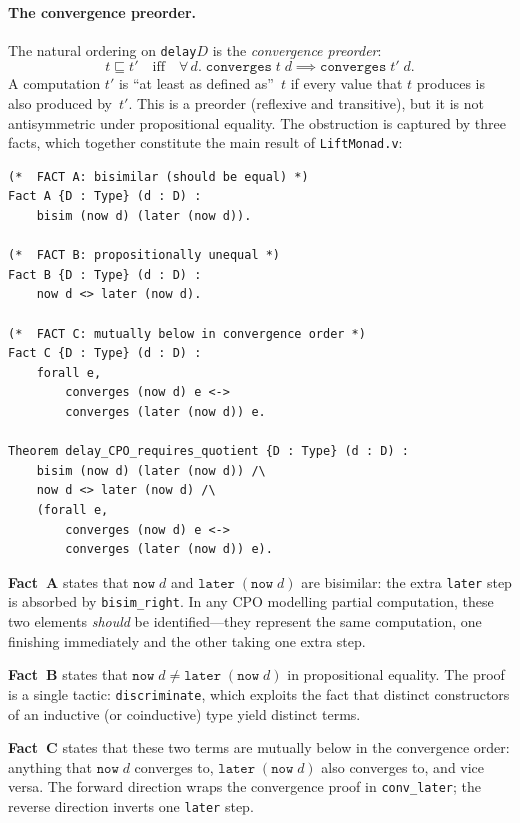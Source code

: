 \paragraph{The convergence preorder.}
The natural ordering on \texttt{delay}\;$D$ is the
\emph{convergence preorder}:
\[
  t \sqsubseteq t'
  \quad\text{iff}\quad
  \forall\, d.\;
  \texttt{converges}\;t\;d \implies \texttt{converges}\;t'\;d.
\]
A computation $t'$ is ``at least as defined as''~$t$ if every value
that $t$ produces is also produced by~$t'$.
This is a preorder (reflexive and transitive), but it is not
antisymmetric under propositional equality.
The obstruction is captured by three facts, which together constitute
the main result of \texttt{LiftMonad.v}:

\begin{lstlisting}[caption={The CPO obstruction theorem
  (\texttt{LiftMonad.v}).},
                    label={lst:obstruction}]
(*  FACT A: bisimilar (should be equal) *)
Fact A {D : Type} (d : D) :
    bisim (now d) (later (now d)).

(*  FACT B: propositionally unequal *)
Fact B {D : Type} (d : D) :
    now d <> later (now d).

(*  FACT C: mutually below in convergence order *)
Fact C {D : Type} (d : D) :
    forall e,
        converges (now d) e <->
        converges (later (now d)) e.

Theorem delay_CPO_requires_quotient {D : Type} (d : D) :
    bisim (now d) (later (now d)) /\
    now d <> later (now d) /\
    (forall e,
        converges (now d) e <->
        converges (later (now d)) e).
\end{lstlisting}

\noindent
\textbf{Fact~A} states that $\texttt{now}\;d$ and
$\texttt{later}\;(\texttt{now}\;d)$ are bisimilar: the extra
\texttt{later} step is absorbed by \texttt{bisim\_right}.
In any CPO modelling partial computation, these two elements
\emph{should} be identified---they represent the same
computation, one finishing immediately and the other taking one
extra step.

\textbf{Fact~B} states that $\texttt{now}\;d \neq
\texttt{later}\;(\texttt{now}\;d)$ in propositional equality.
The proof is a single tactic: \texttt{discriminate}, which exploits
the fact that distinct constructors of an inductive (or coinductive)
type yield distinct terms.

\textbf{Fact~C} states that these two terms are mutually below in
the convergence order: anything that $\texttt{now}\;d$ converges to,
$\texttt{later}\;(\texttt{now}\;d)$ also converges to, and
vice versa.
The forward direction wraps the convergence proof in
\texttt{conv\_later}; the reverse direction inverts one
\texttt{later} step.

